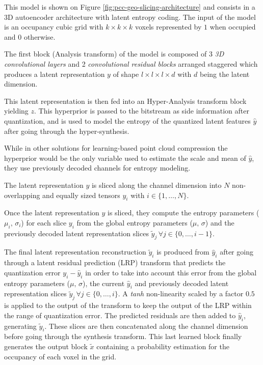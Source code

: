 This model is shown on Figure \ref{fig:pcc-geo-slicing-architecture} and consists in a 3D autoencoder architecture with latent entropy coding. 
The input of the model is an occupancy cubic grid with $k \times k \times k$ voxels represented by $1$ when occupied and $0$ otherwise. 


The first block (Analysis transform) of the model is composed of 3 \textit{3D convolutional layers} and 2 \textit{convolutional residual blocks} arranged staggered which produces a latent representation $y$ of shape $l \times l \times l \times d$ with $d$ being the latent dimension. 


This latent representation is then fed into an Hyper-Analysis transform block yielding $z$. This hyperprior is passed to the bitstream as side information after quantization, and is used to model the entropy of the quantized latent features $\hat{y}$ after going through the hyper-synthesis. 

While in other solutions for learning-based point cloud compression the hyperprior would be the only variable used to estimate the scale and mean of $\hat{y}$, they use previously decoded channels for entropy modeling.

The latent representation $y$ is sliced along the channel dimension into $N$ non-overlapping and equally sized tensors $y_i$ with $i \in \{1, \dots, N\}$. 

Once the latent representation $y$ is sliced, they compute the entropy parameters ($\mu_i,\,\sigma_i$) for each slice $y_i$ from the global entropy parameters ($\mu,\,\sigma$) and the previously decoded latent representation slices $\tilde{y}_j\,\forall j \in \{0,\dots,i-1\}$. 

The final latent representation reconstruction $\tilde{y}_i$ is produced from $\hat{y}_i$ after going through a latent residual prediction (LRP) transform that predicts the quantization error $y_i - \hat{y}_i$ in order to take into account this error from the global entropy parameters ($\mu,\,\sigma$), the current $\hat{y}_i$ and previously decoded latent representation slices $\tilde{y}_j\,\forall j \in \{0,\dots,i\}$. A \textit{tanh} non-linearity scaled by a factor $0.5$ is applied to the output of the transform to keep the output of the LRP within the range of quantization error. 
The predicted residuals are then added to $\hat{y}_i$, generating $\tilde{y}_i$.
These slices are then concatenated along the channel dimension before going through the synthesis transform. This last learned block finally generates the output block $\tilde{x}$ containing a probability estimation for the occupancy of each voxel in the grid.

